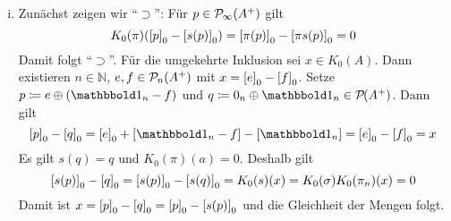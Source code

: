 \begin{beweis}
	\begin{enumerate}[(i)]
		\item Zunächst zeigen wir \enquote{$\supset$}: Für $p \in \Pinfty(A^+)$ gilt 
		\[
			K_0(\pi)\enbrace*{\benbrace*{p}_0 - \benbrace*{s(p)}_0} = \benbrace*{\pi(p)}_0 - \benbrace*{\pi s(p)}_0 =0
		\]
		Damit folgt \enquote{$\supset$}.
		Für die umgekehrte Inklusion sei $x \in K_0(A)$.
		Dann existieren $n \in \mathbb{N}$, $e,f \in \kernedP_n(A^+)$ mit $x = \benbrace*{e}_0 - \benbrace*{f}_0$.
		Setze $p \coloneqq e \oplus (\ind_n -f)$ und $q \coloneqq 0_n \oplus \ind_n \in \kernedP(A^+)$.
		Dann gilt
		\[
			\benbrace*{p}_0 - \benbrace*{q}_0 = \benbrace*{e}_0 + \benbrace*{\ind_n -f} - \benbrace*{\ind_n} = \benbrace*{e}_0 -\benbrace*{f}_0 = x
		\]
		Es gilt $s(q)=q$ und $K_0(\pi)(a) =0$.
		Deshalb gilt
		\[
			\benbrace*{s(p)}_0 - \benbrace*{q}_0 = \benbrace*{s(p)}_0 - \benbrace*{s(q)}_0 = K_0(s)(x) = K_0(\sigma) K_0(\pi_n)(x) =0
		\]
		Damit ist $x = \benbrace*{p}_0 - \benbrace*{q}_0 = \benbrace*{p}_0 - \benbrace*{s(p)}_0$ und die Gleichheit der Mengen folgt.
	\end{enumerate}
\end{beweis}

\begin{proposition}[label=prop:77]
	
\end{proposition}


